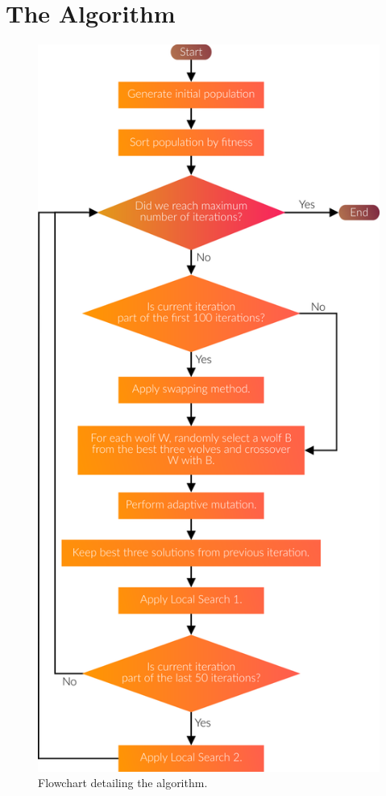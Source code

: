 \section{The Algorithm}
\begin{figure}[c]
	\centering
	\includegraphics{./images/chap05-methodology/flowchart.png}
	\caption{Flowchart detailing the algorithm.}
	\label{algo-flowchart}
\end{figure}

